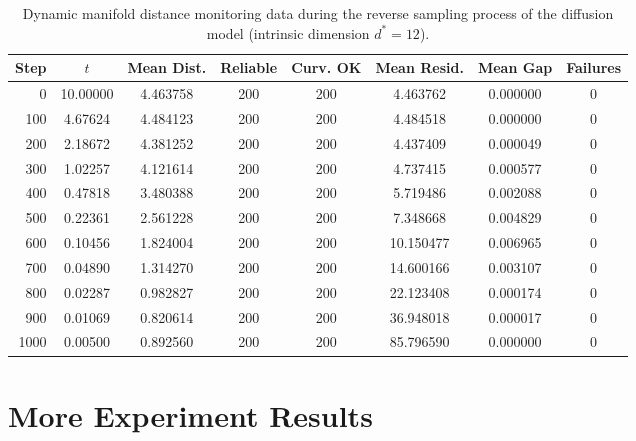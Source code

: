 \documentclass[11pt]{article}
\begin{document}
\begin{table}[htbp]
\centering
\label{tab:manifold_monitoring_d12}
\begin{tabular}{r c c c c c c c}
\toprule
Step & $t$ & Mean Dist. & Reliable & Curv. OK & Mean Resid. & Mean Gap & Failures \\
\midrule
0    & 10.00000 & 4.463758 & 200 & 200 & 4.463762  & 0.000000 & 0 \\
100  & 4.67624  & 4.484123 & 200 & 200 & 4.484518  & 0.000000 & 0 \\
200  & 2.18672  & 4.381252 & 200 & 200 & 4.437409  & 0.000049 & 0 \\
300  & 1.02257  & 4.121614 & 200 & 200 & 4.737415  & 0.000577 & 0 \\
400  & 0.47818  & 3.480388 & 200 & 200 & 5.719486  & 0.002088 & 0 \\
500  & 0.22361  & 2.561228 & 200 & 200 & 7.348668  & 0.004829 & 0 \\
600  & 0.10456  & 1.824004 & 200 & 200 & 10.150477 & 0.006965 & 0 \\
700  & 0.04890  & 1.314270 & 200 & 200 & 14.600166 & 0.003107 & 0 \\
800  & 0.02287  & 0.982827 & 200 & 200 & 22.123408 & 0.000174 & 0 \\
900  & 0.01069  & 0.820614 & 200 & 200 & 36.948018 & 0.000017 & 0 \\
1000 & 0.00500  & 0.892560 & 200 & 200 & 85.796590 & 0.000000 & 0 \\
\bottomrule
\end{tabular}
\vspace{0.5em}
\caption{Dynamic manifold distance monitoring data during the reverse sampling process of the diffusion model (intrinsic dimension $d^*=12$).}
\end{table}

\clearpage
\section{More Experiment Results}\label{append:more experiments}
\end{document}
